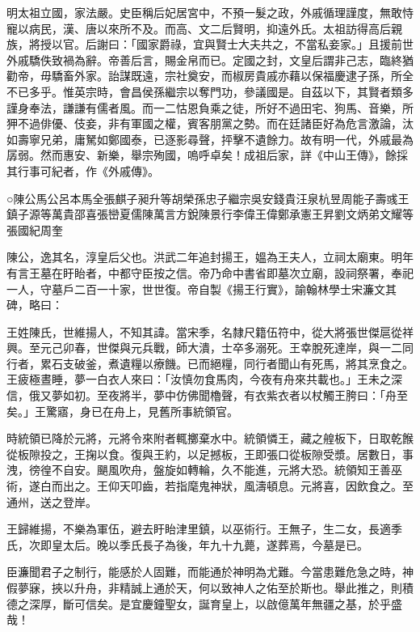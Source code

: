 
\begin{pinyinscope}
明太祖立國，家法嚴。史臣稱后妃居宮中，不預一髮之政，外戚循理謹度，無敢恃寵以病民，漢、唐以來所不及。而高、文二后賢明，抑遠外氏。太祖訪得高后親族，將授以官。后謝曰：「國家爵祿，宜與賢士大夫共之，不當私妾家。」且援前世外戚驕佚致禍為辭。帝善后言，賜金帛而已。定國之封，文皇后謂非己志，臨終猶勸帝，毋驕畜外家。詒謀既遠，宗社奠安，而椒房貴戚亦藉以保福慶逮子孫，所全不已多乎。惟英宗時，會昌侯孫繼宗以奪門功，參議國是。自茲以下，其賢者類多謹身奉法，謙謙有儒者風。而一二怙恩負乘之徒，所好不過田宅、狗馬、音樂，所狎不過俳優、伎妾，非有軍國之權，賓客朋黨之勢。而在廷諸臣好為危言激論，汰如壽寧兄弟，庸駑如鄭國泰，已逐影尋聲，抨擊不遺餘力。故有明一代，外戚最為孱弱。然而惠安、新樂，舉宗殉國，嗚呼卓矣！成祖后家，詳《中山王傳》，餘採其行事可紀者，作《外戚傳》。

○陳公馬公呂本馬全張麒子昶升等胡榮孫忠子繼宗吳安錢貴汪泉杭昱周能子壽彧王鎮子源等萬貴邵喜張巒夏儒陳萬言方銳陳景行李偉王偉鄭承憲王昇劉文炳弟文耀等張國紀周奎

陳公，逸其名，淳皇后父也。洪武二年追封揚王，媼為王夫人，立祠太廟東。明年有言王墓在盱眙者，中都守臣按之信。帝乃命中書省即墓次立廟，設祠祭署，奉祀一人，守墓戶二百一十家，世世復。帝自製《揚王行實》，諭翰林學士宋濂文其碑，略曰：

王姓陳氏，世維揚人，不知其諱。當宋季，名隸尺籍伍符中，從大將張世傑扈從祥興。至元己卯春，世傑與元兵戰，師大潰，士卒多溺死。王幸脫死達岸，與一二同行者，累石支破釜，煮遺糧以療饑。已而絕糧，同行者聞山有死馬，將其烹食之。王疲極晝睡，夢一白衣人來曰：「汝慎勿食馬肉，今夜有舟來共載也。」王未之深信，俄又夢如初。至夜將半，夢中仿佛聞櫓聲，有衣紫衣者以杖觸王胯曰：「舟至矣。」王驚寤，身已在舟上，見舊所事統領官。

時統領已降於元將，元將令來附者輒擲棄水中。統領憐王，藏之艎板下，日取乾餱從板隙投之，王掬以食。復與王約，以足撼板，王即張口從板隙受漿。居數日，事洩，徬徨不自安。颶風吹舟，盤旋如轉輪，久不能進，元將大恐。統領知王善巫術，遂白而出之。王仰天叩齒，若指麾鬼神狀，風濤頓息。元將喜，因飲食之。至通州，送之登岸。

王歸維揚，不樂為軍伍，避去盱眙津里鎮，以巫術行。王無子，生二女，長適季氏，次即皇太后。晚以季氏長子為後，年九十九薨，遂葬焉，今墓是已。

臣濂聞君子之制行，能感於人固難，而能通於神明為尤難。今當患難危急之時，神假夢寐，挾以升舟，非精誠上通於天，何以致神人之佑至於斯也。舉此推之，則積德之深厚，斷可信矣。是宜慶鐘聖女，誕育皇上，以啟億萬年無疆之基，於乎盛哉！


\end{pinyinscope}
